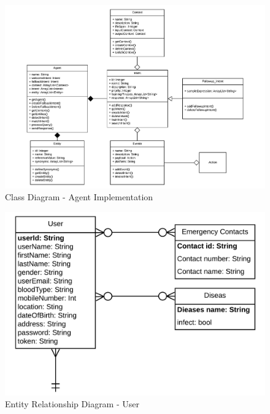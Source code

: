 \documentclass{scrreprt}
\begin{document}
\clearpage
\begin{figure}[ht!]
    \centering
    \includegraphics[angle=90, height=.94\textheight]{img2/ClassDiagramAgent.pdf}
    \caption{Class Diagram - Agent Implementation}
    \label{fig:classdiagramagent}
\end{figure}


\clearpage
\begin{figure}[ht!]
    \centering
    \includegraphics[angle=0, width=\textwidth]{img2/erd1.pdf}
    \caption{Entity Relationship Diagram - User}
    \label{fig:erd1}
\end{figure}
\end{document}

